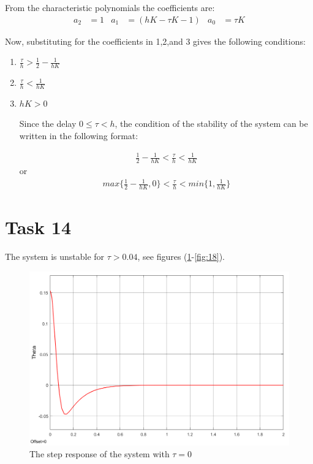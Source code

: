 \documentclass[a4paper,12pt,oneside,onecolumn]{article} %
\begin{document}
From the characteristic polynomials the coefficients are: 
\begin{align*}
a_2&=1 & a_1&=(hK -\tau K -1) & a_0&=\tau K
\end{align*} 

Now, substituting for the coefficients in 1,2,and 3 gives the following conditions: 
\begin{enumerate} 
\item $\frac{\tau}{h}>\frac{1}{2}-\frac{1}{hK}$
\item $\frac{\tau}{h}<\frac{1}{hK}$
\item $hK>0$

Since the delay $0 \leq \tau < h$, the condition of the stability of the system can be written in the following format: 

\begin{align*}
\frac{1}{2}-\frac{1}{hK} <\frac{\tau}{h} < \frac{1}{hK}
\end{align*}
or
\begin{align*}
max\{\frac{1}{2}-\frac{1}{hK},0\} <\frac{\tau}{h} < min\{1,\frac{1}{hK}\}
\end{align*} 

\end{enumerate} 

\section*{Task 14}

The system is unstable for $ \tau > 0.04$, see figures (\ref{fig:15}-\ref{fig:18}).

\begin{figure}[H]
    \centering
    \includegraphics[scale=0.5]{Task_14_00.png}
    \caption{The step response of the system with $\tau=0$}
    \label{fig:15}
\end{figure}
\end{document}
